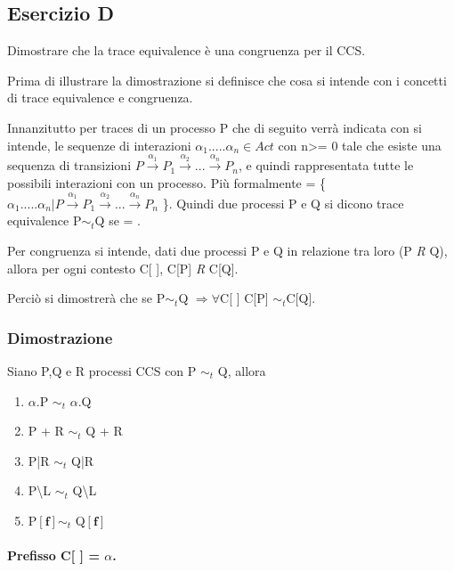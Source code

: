 \pagebreak
\subsection{Esercizio D} 
Dimostrare che la trace equivalence è una congruenza per il CCS.

Prima di illustrare la dimostrazione si definisce che cosa si intende con i concetti di trace equivalence e congruenza.

Innanzitutto per traces di un processo P che di seguito verrà indicata con  si intende, le sequenze di interazioni $\alpha_{1}.....\alpha_{n} \in Act$ con n>= 0 tale che esiste una sequenza di transizioni $P \overset{\alpha_{1}}\rightarrow P_{1} \overset{\alpha_{2}}\rightarrow...\overset{\alpha_{n}}\rightarrow P_{n}$, e quindi rappresentata tutte le possibili interazioni con un processo. Più formalmente  = \{ $\alpha_{1}.....\alpha_{n} | P \overset{\alpha_{1}}\rightarrow P_{1} \overset{\alpha_{2}}\rightarrow...\overset{\alpha_{n}}\rightarrow P_{n}$ \}. Quindi due processi P e Q si dicono trace equivalence P$\sim_{t}$Q se  = .

Per congruenza si intende, dati due processi P e Q in relazione tra loro (P \textit{R} Q), allora per ogni contesto C[ ], C[P] \textit{R} C[Q]. 

Perciò si dimostrerà che se P$\sim_{t}$Q $\Rightarrow \forall$C[ ] C[P] $\sim_{t}$C[Q].

\subsubsection{Dimostrazione} 

Siano P,Q e R processi CCS con P $\sim_{t}$ Q, allora 

\begin{enumerate}
	\item $\alpha$.P $\sim_{t}$ $\alpha$.Q
	\item P + R $\sim_{t}$ Q + R
	\item P|R $\sim_{t}$ Q|R
	\item P\textbackslash L $\sim_{t}$ Q\textbackslash L
	\item P$\mathbf{[f]}\sim_{t}$ Q$\mathbf{[f]}$
\end{enumerate}

\paragraph{Prefisso C[ ] = $\alpha$.} \mbox{}

